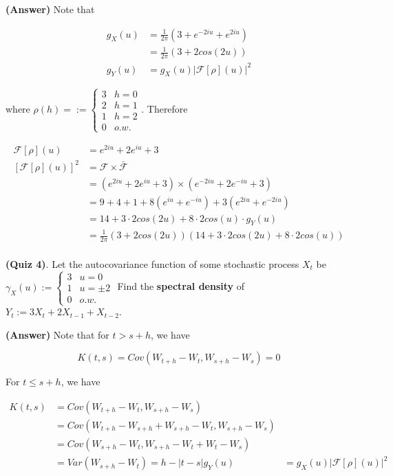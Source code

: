 \documentclass[12pt]{article}
\theoremstyle{nonumberbreak}
\begin{document}
\textbf{(Answer)} Note that 

$$
\begin{aligned}
g_X(u) &= \frac{1}{2\pi} ( 3 + e^{-2iu} + e^{2iu}) \\[8pt]
&= \frac{1}{2\pi} (3 + 2 cos(2u)) \\[10pt]
g_Y(u) &= g_X(u) |\mathcal{F}[\rho] (u)|^2
\end{aligned}
$$

where $\rho(h) = := \begin{cases} 3 & h=0 \\ 2 & h=1 \\ 1 & h=2 \\ 0 & o.w. \end{cases}$. Therefore

$$
\begin{aligned}
\mathcal{F}[\rho] (u) &= e^{2iu} + 2e^{iu} + 3 \\[8pt]
[\mathcal{F}[\rho] (u)]^2 &= \mathcal{F} \times \bar{\mathcal{F}} \\[8pt]
&= (e^{2iu} + 2e^{iu} + 3) \times (e^{-2iu} + 2e^{-iu} + 3) \\[8pt]
&= 9 + 4 + 1 + 8(e^{iu} + e^{-iu}) + 3(e^{2iu} + e^{-2iu}) \\[8pt]
&= 14 + 3\cdot 2cos(2u) + 8\cdot 2 cos(u) \cdot g_Y(u) \\[8pt]
&= \frac{1}{2\pi} (3 + 2cos(2u)) (14 + 3 \cdot 2cos(2u) + 8\cdot 2 cos(u)) \\[8pt]
\end{aligned}
$$



\textbf{(Quiz 4)}. Let the autocovariance function of some stochastic process $X_t$ be $\gamma_X(u) := \begin{cases} 3 & u=0 \\ 1 & u=\pm2 \\ 0 & o.w. \end{cases}$ Find the \textbf{spectral density} of $Y_t := 3X_t + 2X_{t-1} + X_{t-2}$. 

\textbf{(Answer)} Note that for $t > s + h$, we have

$$
K(t,s) = Cov(W_{t+h} - W_t, W_{s+h} - W_s) = 0
$$

For $t \le s + h$, we have

$$
\begin{aligned}
K(t,s) &= Cov(W_{t+h} - W_t, W_{s+h} - W_s) \\[8pt]
&= Cov(W_{t+h} - W_{s+h} + W_{s+h} - W_t, W_{s+h} - W_s) \\[8pt]
&= Cov(W_{s+h} - W_t, W_{s+h} - W_t + W_t - W_s) \\[8pt]
&= Var(W_{s+h} - W_t) = h - |t - s|
g_Y(u) &= g_X(u) |\mathcal{F}[\rho] (u)|^2
\end{aligned}
$$
\end{document}
